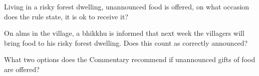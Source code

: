 \bigskip



Living in a risky forest dwelling, unannounced food is offered, on what occasion
does the rule state, it is ok to receive it?


\bigskip

On alms in the village, a bhikkhu is informed that next week the villagers will
bring food to his risky forest dwelling. Does this count as correctly announced?


\bigskip

What two options does the Commentary recommend if unannounced gifts of food are offered?

%

